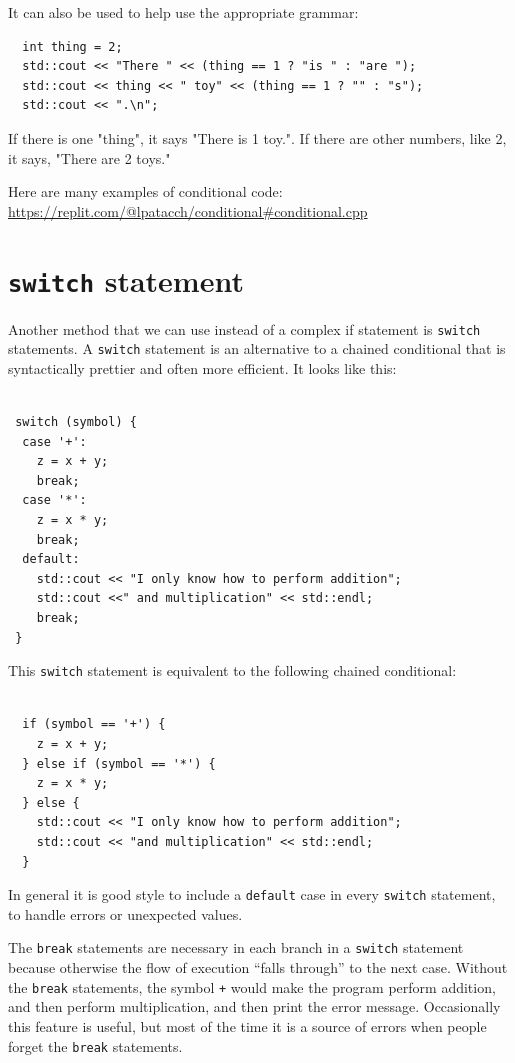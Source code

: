 It can also be used to help use the appropriate grammar:
\begin{lstlisting}
  int thing = 2;
  std::cout << "There " << (thing == 1 ? "is " : "are ");
  std::cout << thing << " toy" << (thing == 1 ? "" : "s");
  std::cout << ".\n";
\end{lstlisting}
If there is one "thing", it says "There is 1 toy.". If there are other
numbers, like 2, it says, "There are 2 toys."


Here are many examples of conditional code: 
\url{https://replit.com/@lpatacch/conditional#conditional.cpp}
\section{{\tt switch} statement}
\label{switch}

Another method that we can use instead of a complex if statement is {\tt switch}
statements.  A {\tt switch} statement
is an alternative to a chained conditional that is syntactically
prettier and often more efficient.  It looks like this:

\begin{lstlisting}
  
 switch (symbol) {
  case '+':
    z = x + y;
    break;
  case '*':
    z = x * y;
    break;
  default:
    std::cout << "I only know how to perform addition";
    std::cout <<" and multiplication" << std::endl;
    break;
 }
\end{lstlisting}
%
This {\tt switch} statement is equivalent to the following chained
conditional:

\begin{lstlisting}
  
  if (symbol == '+') {
    z = x + y;
  } else if (symbol == '*') {
    z = x * y;
  } else {
    std::cout << "I only know how to perform addition";
    std::cout << "and multiplication" << std::endl;
  }
\end{lstlisting}
%
In general it is good style to include a {\tt default} case in
every {\tt switch} statement, to handle errors or unexpected values.

The {\tt break} statements are necessary in each branch
in a {\tt switch} statement because otherwise the flow of execution
``falls through'' to the next case.  Without the {\tt break} statements,
the symbol {\tt +} would make the program perform addition, and
then perform multiplication, and then print the error message.
Occasionally this feature is useful, but most of the time it is
a source of errors when people forget the {\tt break} statements.

